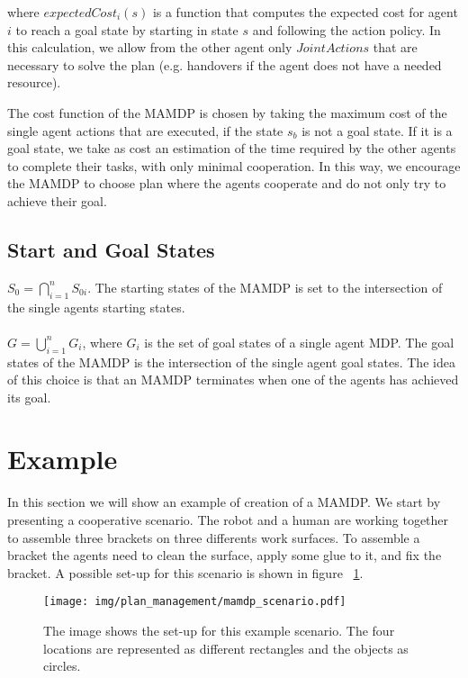 where $expectedCost_i(s)$ is a function that computes the expected cost for agent $i$ to reach a goal state by starting in state $s$ and following the action policy. In this calculation, we allow from the other agent only $JointActions$ that are necessary to solve the plan (e.g. handovers if the agent does not have a needed resource).

The cost function of the MAMDP is chosen by taking the maximum cost of the single agent actions that are executed, if the state $s_b$ is not a goal state. If it is a goal state, we take as cost an estimation of the time required by the other agents to complete their tasks, with only minimal cooperation. In this way, we encourage the MAMDP to choose plan where the agents cooperate and do not only try to achieve their goal.

\subsection{Start and Goal States}
$S_0=\bigcap_{i=1}^n S_{0i}$. The starting states of the MAMDP is set to the intersection of the single agents starting states.\\\\$G=\bigcup_{i=1}^n G_i $, where $G_i$ is the set of goal states of a single agent MDP. The goal states of the MAMDP is the intersection of the single agent goal states. The idea of this choice is that an MAMDP terminates when one of the agents has achieved its goal. 

\section{Example}
In this section we will show an example of creation of a MAMDP. We start by presenting a cooperative scenario. The robot and a human are working together to assemble three brackets on three differents work surfaces. To assemble a bracket the agents need to clean the surface, apply some glue to it, and fix the bracket. A possible set-up for this scenario is shown in figure ~\ref{fig:plan_management-mamdp_scenario}.

 \begin{figure}[ht!]
	\texttt{[image: img/plan\_management/mamdp\_scenario.pdf]}
	\caption[MAMDP example scenario]{The image shows the set-up for this example scenario. The four locations are represented as different rectangles and the objects as circles. }
	\label{fig:plan_management-mamdp_scenario}
\end{figure}

